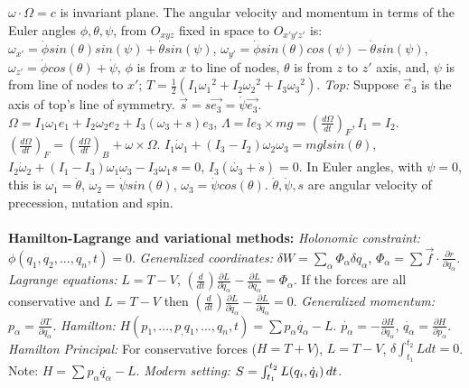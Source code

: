 $\omega \cdot \Omega=c$ is invariant plane. The angular velocity and momentum in
terms of the Euler angles $\phi,\theta, \psi$, from $O_{xyz}$ fixed in space
to $O_{x'y'z'}$ is:
$\omega_{x'}= \dot{\phi} sin( \theta ) sin ( \psi ) + \dot { \theta} sin ( \psi )$,
$\omega_{y'}= \dot{\phi} sin( \theta ) cos ( \psi ) - \dot { \theta} sin ( \psi )$,
$\omega_{z'}= \dot{\phi} cos( \theta ) + \dot { \psi }$, $\phi$ is from $x$ to line of
nodes, 
$\theta$ is from $z$ to $z'$ axis, and, 
$\psi$ is from line of nodes to $x'$;
$T= {\frac 1 2}(I_1 {\omega_1}^2+ I_2 {\omega_2}^2 + I_3 {\omega_3}^2)$.
\emph{Top:}  Suppose $\vec{e}_3$ is the axis of top's line of symmetry.
$\vec{s}= s\vec{e_3}= \dot {\psi} \vec{e_3}$.
$\Omega= I_1 \omega_1 e_1 + I_2 \omega_2 e_2 + I_3 (\omega_3 +s) e_3$, 
$\Lambda= l e_3 \times mg= ({\frac {d \Omega} {dt}})_F, I_1=I_2$.
$ ({\frac {d \Omega} {dt}})_F= ({\frac {d \Omega} {dt}})_B + \omega \times \Omega$.
$I_1 {\dot{\omega}}_1 + (I_3 - I_2) \omega_2 \omega_3 = mgl sin ( \theta )$, 
$I_2 {\dot{\omega}}_2 + (I_1 - I_3) \omega_1 \omega_3 - I_3 \omega_1 s= 0$,
$I_3 (\dot{\omega_3} + \dot{s})= 0$. In Euler angles, with $\psi=0$, this is
$\omega_1= \dot{\theta}$, $\omega_2= \dot{\psi} sin (\theta )$,
$\omega_3= \dot{\psi} cos ( \theta )$. $\dot{\theta},\dot{\psi}, s$ are angular velocity
of precession, nutation and spin.
\\
\\
{\bf Hamilton-Lagrange and variational methods:}
\emph{Holonomic constraint:} $\phi(q_1 , q_2 , ... ,q_n , t)=0$.  \emph{Generalized
coordinates:}
$\delta W= \sum_{\alpha} \Phi_{\alpha} \delta q_{\alpha}$,
$\Phi_{\alpha} =
\sum \vec{f} \cdot {\frac {\partial r} {\partial q_{\alpha}}}$.  
\emph{Lagrange equations:} $L= T - V$, $({\frac d {dt}})
{\frac {\partial L} {\partial {\dot {q}}_{\alpha}}}-
{\frac {\partial L} {\partial q_{\alpha}}}= \Phi_{\alpha}$.  
If the forces are all conservative and $L=T-V$ then
$({\frac d {dt}})
{\frac {\partial L} {\partial {\dot {q}}_{\alpha}}}-
{\frac {\partial L} {\partial q_{\alpha}}}= 0$.  \emph{Generalized momentum:}
$p_{\alpha}= {\frac {\partial T} {\partial {\dot q}_{\alpha}}}$.
\emph{Hamilton:}
$H(p_1 , ..., p_, q_1 , ..., q_n , t)= \sum p_{\alpha} \dot{q_{\alpha}} - L$.
$\dot{p_{\alpha}}= -{\frac {\partial H} {\partial q_{\alpha}}}$,
$\dot{q_{\alpha}}= {\frac {\partial H} {\partial p_{\alpha}}}$.
\emph{Hamilton Principal:} For conservative forces ($H=T+V$),
$L=T-V$, $\delta \int_{t_1}^{t_2} L dt = 0$.  
Note: $H= \sum p_{\alpha} \dot{q_{\alpha}} - L$.
\emph{Modern setting:} $S= \int_{t_1}^{t_2} L(q_i, {\dot {q}}_i) \thinspace dt$.
